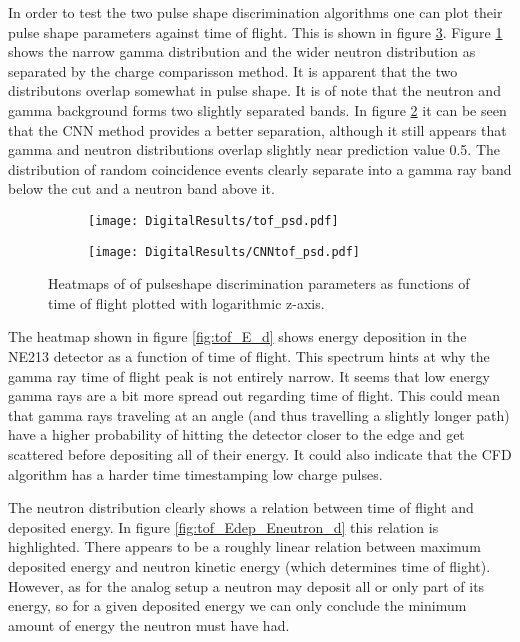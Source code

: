 \documentclass[main.tex]{subfiles}
\begin{document}
In order to test the two pulse shape discrimination algorithms one can plot their pulse shape parameters against time of flight. This is shown in figure \ref{fig:tof_cc_tof_cnn}. Figure \ref{fig:tof_digi_cc} shows the narrow gamma distribution and the wider neutron distribution as separated by the charge comparisson method. It is apparent that the two distributons overlap somewhat in pulse shape. It is of note that the neutron and gamma background forms two slightly separated bands.  In figure \ref{fig:tof_digi_cnn} it can be seen that the CNN method provides a better separation, although it still appears that gamma and neutron distributions overlap slightly near prediction value 0.5. The distribution of random coincidence events clearly separate into a gamma ray band below the cut and a neutron band above it.


\begin{figure}
    \centering
    \begin{subfigure}[ht]{\textwidth}
        \texttt{[image: DigitalResults/tof\_psd.pdf]}
        \caption{}
        \label{fig:tof_digi_cc}
    \end{subfigure}
	\begin{subfigure}[ht]{\textwidth}
        \texttt{[image: DigitalResults/CNNtof\_psd.pdf]}
        \caption{}
        \label{fig:tof_digi_cnn}
    \end{subfigure}
    \caption{Heatmaps of of pulseshape discrimination parameters as functions of time of flight plotted with logarithmic z-axis.}
    \label{fig:tof_cc_tof_cnn}
\end{figure}

The heatmap shown in figure \ref{fig:tof_E_d} shows energy deposition in the NE213 detector as a function of time of flight. This spectrum hints at why the gamma ray time of flight peak is not entirely narrow. It seems that low energy gamma rays are a bit more spread out regarding time of flight. This could mean that gamma rays traveling at an angle (and thus travelling a slightly longer path) have a higher probability of hitting the detector closer to the edge and get scattered before depositing all of their energy. It could also indicate that the CFD algorithm has a harder time timestamping low charge pulses.

The neutron distribution clearly shows a relation between time of flight and deposited energy. In figure \ref{fig:tof_Edep_Eneutron_d} this relation is highlighted. There appears to be a roughly linear relation between maximum deposited energy and neutron kinetic energy (which determines time of flight). However, as for the analog setup a neutron may deposit all or only part of its energy, so for a given deposited energy we can only conclude the minimum amount of energy the neutron must have had.
\end{document}
